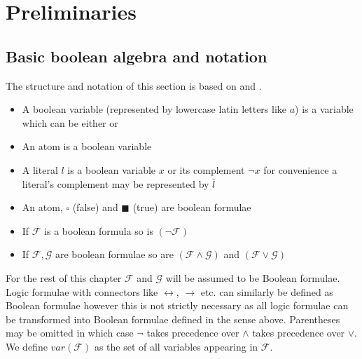 \chapter{Preliminaries}
\section{Basic boolean algebra and notation}
The structure and notation of this section is based on \cite{Marques-Silva-PropositionalSATSolving} and \cite{fondements-logique}.
\begin{definition}

\begin{itemize}
    \item A boolean variable (represented by lowercase latin letters like $a$) is a variable which can be either \true or \false
    \item An atom is a boolean variable
    \item A literal $l$ is a boolean variable $x$ or its complement $\neg x$ for convenience a literal's complement may be represented by $\bar{l}$
\end{itemize}

\end{definition}
\begin{definition}
\begin{itemize}
    \item An atom, $\square$ (false) and $\blacksquare$ (true)  are boolean formulae
    \item If $\mathcal{F}$ is a boolean formula so is $\left(\neg\mathcal{F}\right)$
    \item If $\mathcal{F}, \mathcal{G}$ are boolean formulae so are $\left(\mathcal{F} \land \mathcal{G}\right)$ and $\left(\mathcal{F} \lor \mathcal{G}\right)$
\end{itemize}
\end{definition}
For the rest of this chapter $\mathcal{F}$ and $\mathcal{G}$ will be assumed to be Boolean formulae.\\
Logic formulae with connectors like $\leftrightarrow$, $\rightarrow$ etc. can similarly be defined as Boolean formulae however this is not strictly necessary as all logic formulae can be transformed into Boolean formulae defined in the sense above. Parentheses may be omitted in which case $\neg$ takes precedence over $\land$ takes precedence over $\lor$. We define $var(\mathcal{F})$ as the set of all variables appearing in $\mathcal{F}$.
